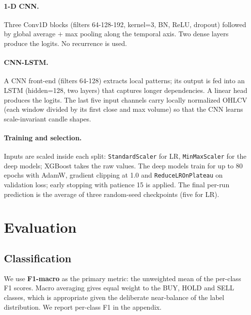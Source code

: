 \documentclass[runningheads]{llncs}
\begin{document}
\paragraph{1-D CNN.}
Three Conv1D blocks (filters 64-128-192, kernel=3, BN, ReLU, dropout) followed by global average $+$ max pooling along the temporal axis. Two dense layers produce the logits. No recurrence is used.

\paragraph{CNN-LSTM.}
A CNN front-end (filters 64-128) extracts local patterns; its output is fed into an LSTM (hidden=128, two layers) that captures longer dependencies. A linear head produces the logits. The last five input channels carry locally normalized OHLCV (each window divided by its first close and max volume) so that the CNN learns scale-invariant candle shapes.

\paragraph{Training and selection.}
Inputs are scaled inside each split: \texttt{StandardScaler} for LR, \texttt{MinMaxScaler} for the deep models; XGBoost takes the raw values. The deep models train for up to 80 epochs with AdamW, gradient clipping at 1.0 and \texttt{ReduceLROnPlateau} on validation loss; early stopping with patience 15 is applied. The final per-run prediction is the average of three random-seed checkpoints (five for LR).

\section{Evaluation}
\label{sec:eval}

\subsection{Classification}
We use \textbf{F1-macro} as the primary metric: the unweighted mean of the per-class F1 scores. Macro averaging gives equal weight to the BUY, HOLD and SELL classes, which is appropriate given the deliberate near-balance of the label distribution. We report per-class F1 in the appendix.
\end{document}
